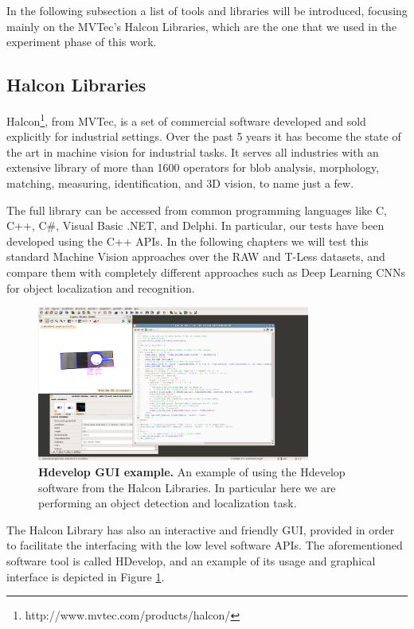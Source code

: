 In the following subsection a list of tools and libraries will be introduced, focusing mainly on the MVTec's Halcon Libraries, which are the one that we used in the experiment phase of this work. 

\subsection{Halcon Libraries}\label{subsec:halconlibs}
Halcon\footnote{http://www.mvtec.com/products/halcon/}, from MVTec, is a set of commercial software developed and sold explicitly for industrial settings. Over the past 5 years it has become the state of the art in machine vision for industrial tasks. It serves all industries with an extensive library of more than 1600 operators for blob analysis, morphology, matching, measuring, identification, and 3D vision, to name just a few.

The full library can be accessed from common programming languages like C, C++, C\#, Visual Basic .NET, and Delphi. In particular, our tests have been developed using the C++ APIs. In the following chapters we will test this standard Machine Vision approaches over the RAW and T-Less datasets, and compare them with completely different approaches such as Deep Learning CNNs for object localization and recognition.

\begin{figure}
    \centering
    \includegraphics[width=0.8\textwidth]{figures/1_perception_and_sensing_in_robotics/hdevelop_gui_example}
    \caption{\textbf{Hdevelop GUI example.} An example of using the Hdevelop software from the Halcon Libraries. In particular here we are performing an object detection and localization task.} 
    \label{fig:hdevelop_example}
\end{figure}

The Halcon Library has also an interactive and friendly GUI, provided in order to facilitate the interfacing with the low level software APIs. The aforementioned software tool is called HDevelop, and an example of its usage and graphical interface is depicted in Figure \ref{fig:hdevelop_example}.

